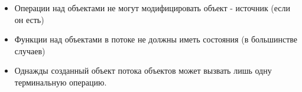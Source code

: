 \begin{frame}
\frametitle{\insertsection} 
\framesubtitle{\insertsubsection}
\begin{itemize}
	\item Операции над объектами не могут модифицировать объект - источник (если он есть)
	\item Функции над объектами в потоке не должны иметь состояния (в большинстве случаев)
	\item Однажды созданный объект потока объектов может вызвать лишь одну терминальную операцию.
	\inputminted{java}{code/OneTermination.java}
\end{itemize}
\end{frame}